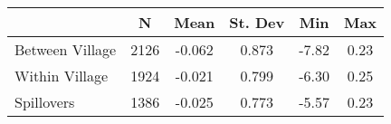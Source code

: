\begin{tabular}{l*{5}{c}}\hline&\multicolumn{1}{c}{N}&\multicolumn{1}{c}{Mean}&\multicolumn{1}{c}{St. Dev}&\multicolumn{1}{c}{Min}&\multicolumn{1}{c}{Max}\\ \hline 
Between Village & 2126 & -0.062 & 0.873 & -7.82 & 0.23 \\
Within Village & 1924 & -0.021 & 0.799 & -6.30 & 0.25 \\
Spillovers & 1386 & -0.025 & 0.773 & -5.57 & 0.23 \\
\hline \end{tabular}

